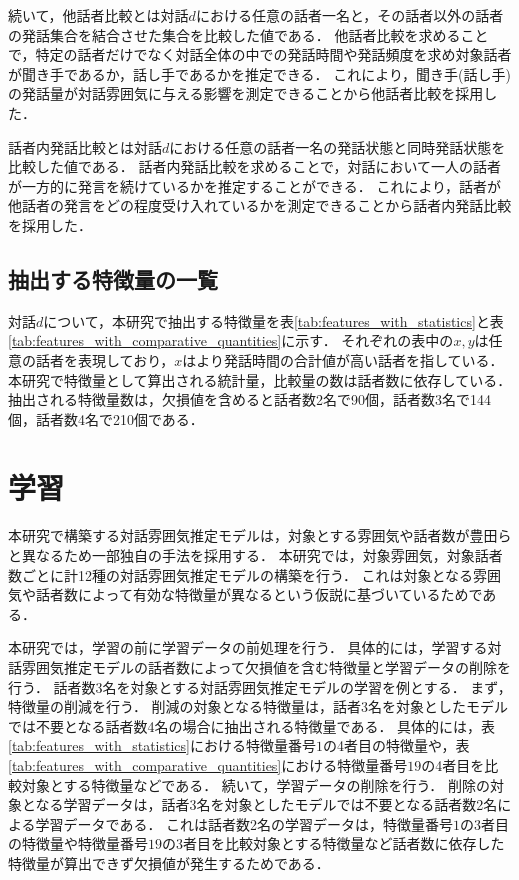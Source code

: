 続いて，他話者比較とは対話$d$における任意の話者一名と，その話者以外の話者の発話集合を結合させた集合を比較した値である．
他話者比較を求めることで，特定の話者だけでなく対話全体の中での発話時間や発話頻度を求め対象話者が聞き手であるか，話し手であるかを推定できる．
これにより，聞き手(話し手)の発話量が対話雰囲気に与える影響を測定できることから他話者比較を採用した．

話者内発話比較とは対話$d$における任意の話者一名の発話状態と同時発話状態を比較した値である．
話者内発話比較を求めることで，対話において一人の話者が一方的に発言を続けているかを推定することができる．
これにより，話者が他話者の発言をどの程度受け入れているかを測定できることから話者内発話比較を採用した．

\subsection{抽出する特徴量の一覧}

対話$d$について，本研究で抽出する特徴量を表\ref{tab:features_with_statistics}と表\ref{tab:features_with_comparative_quantities}に示す．
それぞれの表中の$x, y$は任意の話者を表現しており，$x$はより発話時間の合計値が高い話者を指している．
本研究で特徴量として算出される統計量，比較量の数は話者数に依存している．
抽出される特徴量数は，欠損値を含めると話者数2名で90個，話者数3名で144個，話者数4名で210個である．




\section{学習\label{node:machine_learning}}

本研究で構築する対話雰囲気推定モデルは，対象とする雰囲気や話者数が豊田らと異なるため一部独自の手法を採用する．
本研究では，対象雰囲気，対象話者数ごとに計12種の対話雰囲気推定モデルの構築を行う．
これは対象となる雰囲気や話者数によって有効な特徴量が異なるという仮説に基づいているためである．

本研究では，学習の前に学習データの前処理を行う．
具体的には，学習する対話雰囲気推定モデルの話者数によって欠損値を含む特徴量と学習データの削除を行う．
話者数3名を対象とする対話雰囲気推定モデルの学習を例とする．
まず，特徴量の削減を行う．
削減の対象となる特徴量は，話者3名を対象としたモデルでは不要となる話者数4名の場合に抽出される特徴量である．
具体的には，表\ref{tab:features_with_statistics}における特徴量番号$1$の4者目の特徴量や，表\ref{tab:features_with_comparative_quantities}における特徴量番号$19$の4者目を比較対象とする特徴量などである．
続いて，学習データの削除を行う．
削除の対象となる学習データは，話者3名を対象としたモデルでは不要となる話者数2名による学習データである．
これは話者数2名の学習データは，特徴量番号$1$の3者目の特徴量や特徴量番号$19$の3者目を比較対象とする特徴量など話者数に依存した特徴量が算出できず欠損値が発生するためである．


